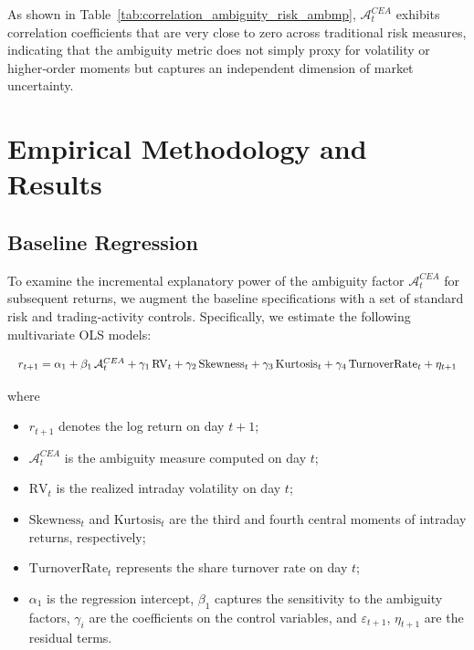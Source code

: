 \documentclass[preprint,12pt,authoryear]{elsarticle}
\begin{document}
As shown in Table~\ref{tab:correlation_ambiguity_risk_ambmp}, \(\mathcal{A}^{CEA}_t\) exhibits correlation coefficients that are very close to zero across traditional risk measures, indicating that the ambiguity metric does not simply proxy for volatility or higher‑order moments but captures an independent dimension of market uncertainty.

\section{Empirical Methodology and Results}

\subsection{Baseline Regression}

To examine the incremental explanatory power of the ambiguity factor \(\mathcal{A}^{CEA}_t\) for subsequent returns, we augment the baseline specifications with a set of standard risk and trading‑activity controls. Specifically, we estimate the following multivariate OLS models:

\begin{equation}
\resizebox{\linewidth}{!}{$
  r_{t+1} = \alpha_1 + \beta_1\,\mathcal{A}^{CEA}_t
            + \gamma_{1}\,\mathrm{RV}_t
            + \gamma_{2}\,\mathrm{Skewness}_t
            + \gamma_{3}\,\mathrm{Kurtosis}_t
            + \gamma_{4}\,\mathrm{TurnoverRate}_t
            + \eta_{t+1}
$}
\end{equation}

where
\begin{itemize}
  \item \(r_{t+1}\) denotes the log return on day \(t+1\);
  \item \(\mathcal{A}^{CEA}_t\) is the ambiguity measure computed on day \(t\);
  \item \(\mathrm{RV}_t\) is the realized intraday volatility on day \(t\);
  \item \(\mathrm{Skewness}_t\) and \(\mathrm{Kurtosis}_t\) are the third and fourth central moments of intraday returns, respectively;
  \item \(\mathrm{TurnoverRate}_t\) represents the share turnover rate on day \(t\);
  \item \(\alpha_1\) is the regression intercept, \(\beta_1\) captures the sensitivity to the ambiguity factors, \(\gamma_i\) are the coefficients on the control variables, and \(\varepsilon_{t+1}\), \(\eta_{t+1}\) are the residual terms.
\end{itemize}
\end{document}
